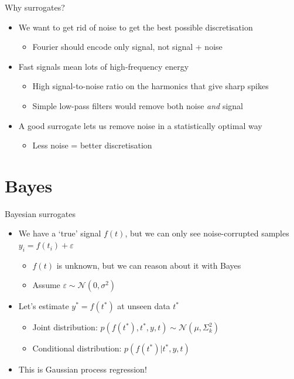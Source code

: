 \documentclass[presentation]{beamer}
\begin{document}
\begin{frame}[<+->][label={sec:orga3c086c}]{Why surrogates?}
\begin{itemize}
\item We want to get rid of noise to get the best possible discretisation
\begin{itemize}
\item Fourier should encode only signal, not signal + noise
\end{itemize}
\end{itemize}
\vfill
\begin{itemize}
\item Fast signals mean lots of high-frequency energy
\begin{itemize}
\item High signal-to-noise ratio on the harmonics that give sharp spikes
\item Simple low-pass filters would remove both noise \emph{and} signal
\end{itemize}
\end{itemize}
\vfill
\begin{itemize}
\item A good surrogate lets us remove noise in a statistically optimal way
\begin{itemize}
\item Less noise = better discretisation
\end{itemize}
\end{itemize}
\end{frame}

\section{Bayes}
\label{sec:org8933b03}
\begin{frame}[<+->][label={sec:org78c0c26}]{Bayesian surrogates}
\begin{itemize}
\item We have a `true' signal \(f(t)\), but we can only see noise-corrupted samples \(y_i = f(t_i) + \varepsilon\)
\begin{itemize}
\item \(f(t)\) is unknown, but we can reason about it with Bayes
\item Assume \(\varepsilon\sim\mathcal{N}(0, \sigma^2)\)
\end{itemize}
\item Let's estimate \(y^*=f(t^*)\) at unseen data \(t^*\)
\begin{itemize}
\item Joint distribution: \(p(f(t^*),t^*,y,t) \sim \mathcal{N}(\mu, \Sigma_k^2)\)
\item Conditional distribution: \(p(f(t^*)|t^*, y, t)\)
\end{itemize}
\item This is Gaussian process regression!
\end{itemize}
\end{frame}
\end{document}
